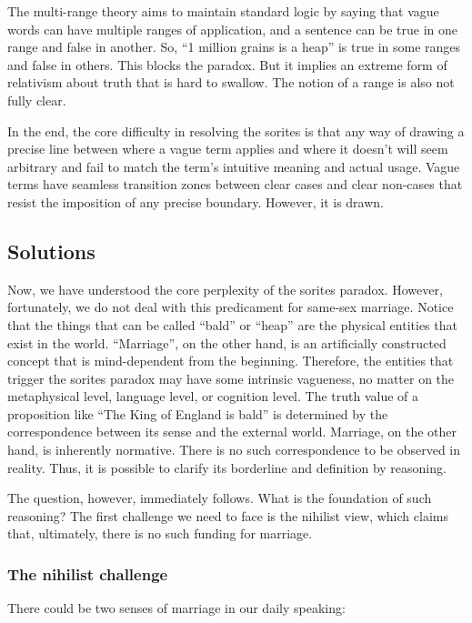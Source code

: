 \documentclass[man,floatsintext]{apa7}
\begin{document}
The multi-range theory aims to maintain standard logic by saying that vague words can have multiple ranges of application, and a sentence can be true in one range and false in another. So, ``1 million grains is a heap'' is true in some ranges and false in others. This blocks the paradox. But it implies an extreme form of relativism about truth that is hard to swallow. The notion of a range is also not fully clear.

In the end, the core difficulty in resolving the sorites is that any way of drawing a precise line between where a vague term applies and where it doesn't will seem arbitrary and fail to match the term's intuitive meaning and actual usage. Vague terms have seamless transition zones between clear cases and clear non-cases that resist the imposition of any precise boundary. However, it is drawn.

\subsection{Solutions}

Now, we have understood the core perplexity of the sorites paradox. However, fortunately, we do not deal with this predicament for same-sex marriage. Notice that the things that can be called ``bald'' or ``heap'' are the physical entities that exist in the world. ``Marriage'', on the other hand, is an artificially constructed concept that is mind-dependent from the beginning. Therefore, the entities that trigger the sorites paradox may have some intrinsic vagueness, no matter on the metaphysical level, language level, or cognition level. The truth value of a proposition like ``The King of England is bald'' is determined by the correspondence between its sense and the external world. Marriage, on the other hand, is inherently normative. There is no such correspondence to be observed in reality. Thus, it is possible to clarify its borderline and definition by reasoning.

The question, however, immediately follows. What is the foundation of such reasoning? The first challenge we need to face is the nihilist view, which claims that, ultimately, there is no such funding for marriage.

\subsubsection{The nihilist challenge}
\label{nihi}

There could be two senses of marriage in our daily speaking: 
\end{document}
